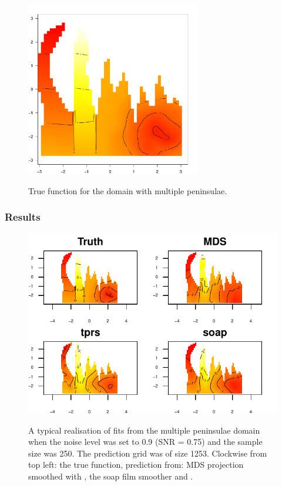 \begin{figure}
\centering
\includegraphics[width=3in]{mds/figs/wt2-truth.pdf} \\
\caption{True function for the domain with multiple peninsulae.}
\label{wt2-truth}
\end{figure}

\subsubsection{Results}

\begin{figure}
\centering
\includegraphics[width=6in]{mds/figs/wt2-comp-09.pdf} \\
\caption{A typical realisation of fits from the multiple peninsulae domain when the noise level was set to 0.9 (SNR = 0.75) and the sample size was 250. The prediction grid was of size 1253. Clockwise from top left: the true function, prediction from: MDS projection smoothed with \tprs, the soap film smoother and \tprs.}
\label{wt2-comp-0.9}
\end{figure}

